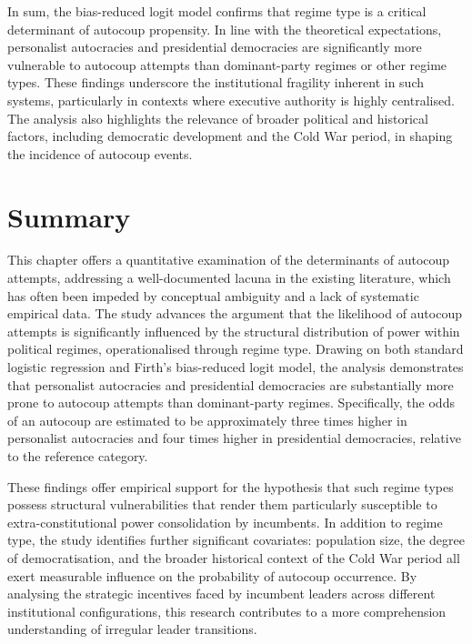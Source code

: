 \documentclass[
  12pt,
]{report}
\begin{document}
In sum, the bias-reduced logit model confirms that regime type is a
critical determinant of autocoup propensity. In line with the
theoretical expectations, personalist autocracies and presidential
democracies are significantly more vulnerable to autocoup attempts than
dominant-party regimes or other regime types. These findings underscore
the institutional fragility inherent in such systems, particularly in
contexts where executive authority is highly centralised. The analysis
also highlights the relevance of broader political and historical
factors, including democratic development and the Cold War period, in
shaping the incidence of autocoup events.

\section{Summary}\label{summary-1}

This chapter offers a quantitative examination of the determinants of
autocoup attempts, addressing a well-documented lacuna in the existing
literature, which has often been impeded by conceptual ambiguity and a
lack of systematic empirical data. The study advances the argument that
the likelihood of autocoup attempts is significantly influenced by the
structural distribution of power within political regimes,
operationalised through regime type. Drawing on both standard logistic
regression and Firth's bias-reduced logit model, the analysis
demonstrates that personalist autocracies and presidential democracies
are substantially more prone to autocoup attempts than dominant-party
regimes. Specifically, the odds of an autocoup are estimated to be
approximately three times higher in personalist autocracies and four
times higher in presidential democracies, relative to the reference
category.

These findings offer empirical support for the hypothesis that such
regime types possess structural vulnerabilities that render them
particularly susceptible to extra-constitutional power consolidation by
incumbents. In addition to regime type, the study identifies further
significant covariates: population size, the degree of democratisation,
and the broader historical context of the Cold War period all exert
measurable influence on the probability of autocoup occurrence. By
analysing the strategic incentives faced by incumbent leaders across
different institutional configurations, this research contributes to a
more comprehension understanding of irregular leader transitions.
\end{document}
